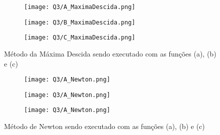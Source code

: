 \documentclass[fleqn, 11pt]{article}
\begin{document}
\begin{figure}[H]
\centering
\begin{subfigure}{.5\textwidth}
  \centering
  \texttt{[image: Q3/A\_MaximaDescida.png]}
\end{subfigure}%
\begin{subfigure}{.5\textwidth}
  \centering
  \texttt{[image: Q3/B\_MaximaDescida.png]}
\end{subfigure}
\begin{subfigure}{.5\textwidth}
  \centering
  \texttt{[image: Q3/C\_MaximaDescida.png]}
\end{subfigure}
\caption{Método da Máxima Descida sendo executado com as funções (a), (b) e (c)}
\end{figure}

\begin{figure}[H]
\centering
\begin{subfigure}{.5\textwidth}
  \centering
  \texttt{[image: Q3/A\_Newton.png]}
\end{subfigure}%
\begin{subfigure}{.5\textwidth}
  \centering
  \texttt{[image: Q3/A\_Newton.png]}
\end{subfigure}
\begin{subfigure}{.5\textwidth}
  \centering
  \texttt{[image: Q3/A\_Newton.png]}
\end{subfigure}
\caption{Método de Newton sendo executado com as funções (a), (b) e (c)}
\end{figure}
\end{document}
